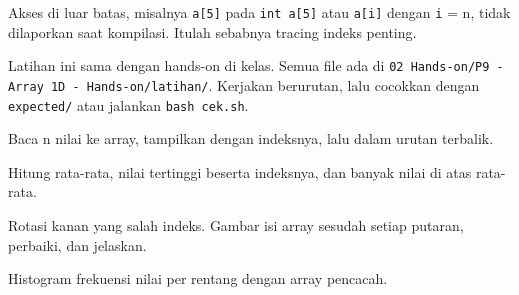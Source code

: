 \documentclass[a4paper]{article}
\begin{document}
Akses di luar batas, misalnya \texttt{a[5]} pada \texttt{int a[5]} atau \texttt{a[i]} dengan \texttt{i} = n, tidak dilaporkan saat kompilasi. Itulah sebabnya tracing indeks penting.

Latihan ini sama dengan hands-on di kelas. Semua file ada di \texttt{02 Hands-on/P9 - Array 1D - Hands-on/latihan/}. Kerjakan berurutan, lalu cocokkan dengan \texttt{expected/} atau jalankan \texttt{bash cek.sh}.
\par\vspace{4pt}\par\vspace{6pt}
Baca n nilai ke array, tampilkan dengan indeksnya, lalu dalam urutan terbalik.

Hitung rata-rata, nilai tertinggi beserta indeksnya, dan banyak nilai di atas rata-rata.

Rotasi kanan yang salah indeks. Gambar isi array sesudah setiap putaran, perbaiki, dan jelaskan.

Histogram frekuensi nilai per rentang dengan array pencacah.
\end{document}
